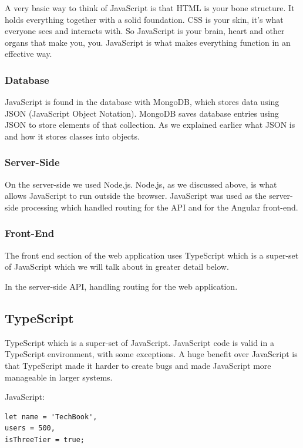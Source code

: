 A very basic way to think of JavaScript is that HTML is your bone structure. It holds everything together with a solid foundation. CSS is your skin, it's what everyone sees and interacts with. So JavaScript is your brain, heart and other organs that make you, you. JavaScript is what makes everything function in an effective way.

\subsubsection{Database}
JavaScript is found in the database with MongoDB, which stores data using JSON (JavaScript Object Notation). MongoDB saves database entries using JSON to store elements of that collection. As we explained earlier what JSON is and how it stores classes into objects.

\subsubsection{Server-Side}
On the server-side we used Node.js. Node.js, as we discussed above, is what allows JavaScript to run outside the browser. JavaScript was used as the server-side processing which handled routing for the API and for the Angular front-end.

\subsubsection{Front-End}
The front end section of the web application uses TypeScript which is a super-set of JavaScript which we will talk about in greater detail below.

In the server-side API, handling routing for the web application. 

\subsection{TypeScript}
TypeScript which is a super-set of JavaScript. JavaScript code is valid in a TypeScript environment, with some exceptions. A huge benefit over JavaScript is that TypeScript made it harder to create bugs and made JavaScript more manageable in larger systems.

\vspace{5mm}

JavaScript:
\begin{verbatim}
let name = 'TechBook',
users = 500,
isThreeTier = true;
\end{verbatim}

